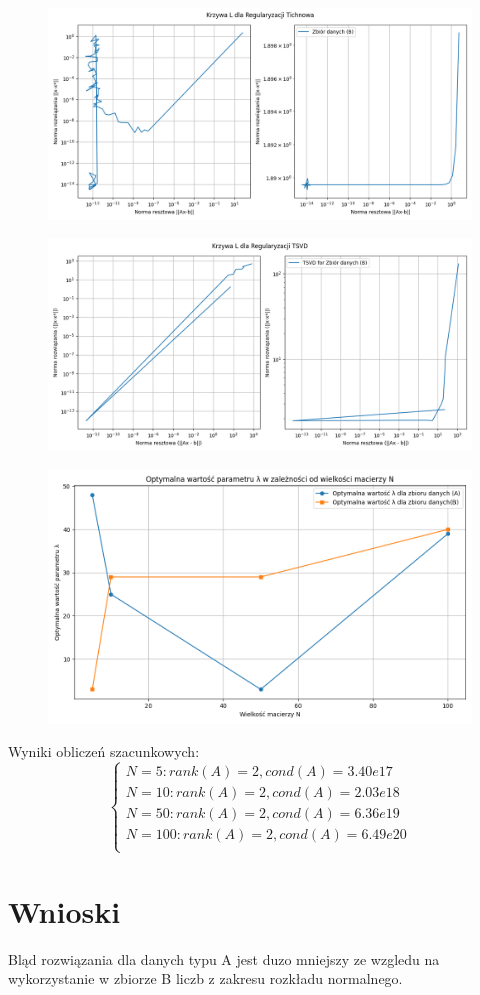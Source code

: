 \documentclass{article}
\begin{document}
\begin{figure}[!h]
  \includegraphics[scale=0.45]{Ltikhonov.png}
  \centering
  \end{figure}
  \begin{figure}[!h]
    \includegraphics[scale=0.45]{LTSVD.png}
    \centering
    \end{figure}
    \begin{figure}[!h]
      \includegraphics[scale=0.55]{optimals.png}
      \centering
      \end{figure}
Wyniki obliczeń szacunkowych:
      \begin{equation}
        \begin{cases}
          N=5 : rank(A) = 2 , cond(A) = 3.40e17\\
          N=10 : rank(A) = 2 , cond(A) = 2.03e18\\
          N=50 : rank(A) = 2 , cond(A) = 6.36e19\\
          N=100 : rank(A) = 2 , cond(A) = 6.49e20\\
      
      
        \end{cases}
      \end{equation}
\section{Wnioski}
Bląd rozwiązania dla danych typu A jest duzo mniejszy ze wzgledu na wykorzystanie w zbiorze B liczb z zakresu rozkładu normalnego.\\
\end{document}

